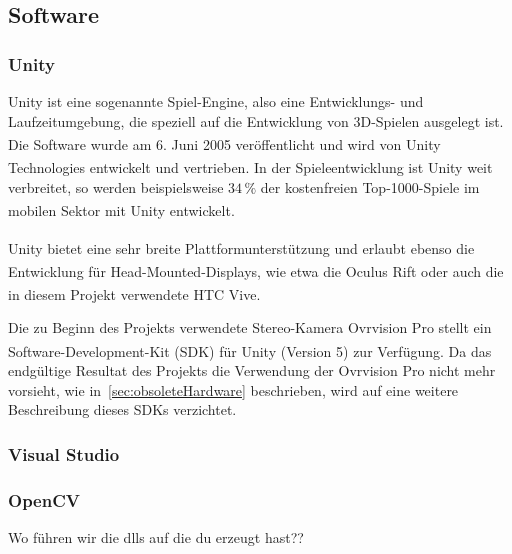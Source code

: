 \subsection{Software}
\subsubsection{Unity}\label{unity}
Unity ist eine sogenannte Spiel-Engine, also eine Entwicklungs- und Laufzeitumgebung, die speziell auf die Entwicklung von 3D-Spielen ausgelegt ist. Die Software wurde am 6. Juni 2005 veröffentlicht\textsuperscript{\cite{haas2014history}} und wird von Unity Technologies\textsuperscript{\cite{website:Unity}} entwickelt und vertrieben. In der Spieleentwicklung ist Unity weit verbreitet, so werden beispielsweise $34\,\%$ der kostenfreien Top-1000-Spiele im mobilen Sektor mit Unity entwickelt\textsuperscript{\cite{website:UnityPR}}.

Unity bietet eine sehr breite Plattformunterstützung\textsuperscript{\cite{website:UnityMultiPlatform}} und erlaubt ebenso die Entwicklung für Head-Mounted-Displays, wie etwa die Oculus Rift\textsuperscript{\cite{website:UnityOculus}\cite{website:UnityVRoverview}} oder auch die in diesem Projekt verwendete HTC Vive.\textsuperscript{\cite{website:UnityVRoverview}}

Die zu Beginn des Projekts verwendete Stereo-Kamera Ovrvision Pro stellt ein Software-Development-Kit (SDK) für Unity (Version 5) zur Verfügung.\textsuperscript{\cite{website:ovrvisionSetup}} Da das endgültige Resultat des Projekts die Verwendung der Ovrvision Pro nicht mehr vorsieht, wie in~\ref{sec:obsoleteHardware} beschrieben, wird auf eine weitere Beschreibung dieses SDKs verzichtet.

\subsubsection{Visual Studio} 
\subsubsection{OpenCV} 
Wo führen wir die dlls auf die du erzeugt hast??


